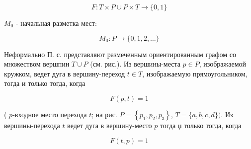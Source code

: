 \documentclass[10pt]{article}
\begin{document}
\[

F: T \times P \cup P \times T \longrightarrow\{0,1\}

\]



$M_{0}$ - начальная разметка мест:



\[

M_{0}: P \longrightarrow\{0,1,2, \ldots\}

\]



Неформально П. с. представляют размеченным ориентированным графом со множеством вершпин $T \cup P$ (см. рис.). Из вершины-места $p \in P$, изображаемой кружком, ведет дуга в вершину-переход $t \in T$, изображаемую прямоугольником, тогда и только тогда, когда



\[

F(p, t)=1

\]



( $p$-входное место перехода $t$; на рис. $P=\left\{p_{1}, p_{2}, p_{3}\right\}$, $T=\{a, b, c, d\})$. Из вершины-перехода $t$ ведет дуга в вершину-место $p$ тогда џ только тогда, когда



\[

F(t, p)=1

\]
\end{document}
